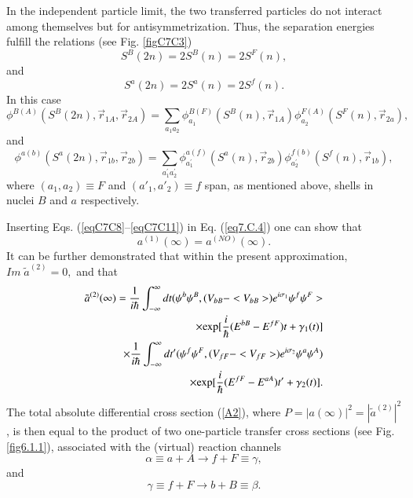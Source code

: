 \begin{subappendices}
In the independent particle limit, the two transferred particles do not interact among themselves but for antisymmetrization. 
Thus, the separation energies fulfill the relations (see Fig. \ref{figC7C3})
\begin{equation}\label{eqC7C8}
S^B(2n) = 2 S^B(n) = 2S^F(n),
\end{equation}
and 
\begin{equation}\label{eqC7C9}
S^a(2n) = 2 S^a(n) = 2 S^f(n).
\end{equation}
In this case 
\begin{equation}\label{eqC7C10}
\phi^{B(A)} (S^B(2n), \vec r_{1A},\vec r_{2A}) = \sum_{a_1 a_2} \phi_{a_1}^{B(F)} (S^B(n),\vec r_{1A}) 
\phi_{a_{2}}^{F(A)} (S^F(n),\vec r_{2a}),
\end{equation}
and 
\begin{equation}\label{eqC7C11}
\phi^{a(b)} (S^a(2n), \vec r_{1b},\vec r_{2b}) = 
\sum_{a^{'}_{1} a^{'}_{2}} \phi_{a^{'}_1}^{a(f)} (S^a(n),\vec r_{2b}) 
\phi_{a^{'}_{2}}^{f(b)} (S^f(n),\vec r_{1b}),
\end{equation}
where $(a_1, a_2) \equiv F$ and $(a'_1, a'_2) \equiv f$ span, as mentioned above, shells in nuclei $B$ and $a$ respectively. 

Inserting Eqs. (\ref{eqC7C8}--\ref{eqC7C11}) in Eq. (\ref{eq7.C.4}) one can show that 
\begin{equation}\label{eqC7C12}
a^{(1)} (\infty) = a^{(NO)}(\infty).
\end{equation}
It can be further demonstrated  that within the present approximation, $Im \; \tilde a^{(2)} =0,$ and that 
\begin{eqnarray}\label{eqC7C13}
\nonumber \tilde a^{(2)} (\infty) = \frac{1}{i \hbar} \int^{\infty}_{-\infty} dt (\psi^b \psi^B, (V_{bB} - <V_{bB}>) e^{i \sigma_1} \psi^f \psi^F >\\
\nonumber  \times 
{\rm exp} [\frac{i}{\hbar} (E^{bB} - E^{fF}) t + \gamma_1(t)] \nonumber  \\
\nonumber \times \frac{1}{i \hbar} \int^{\infty}_{-\infty} dt' (\psi^f \psi^F, (V_{fF} - <V_{fF}>) e^{i \sigma_2} \psi^a \psi^A ) \\
\times 
{\rm exp} [\frac{i}{\hbar} (E^{fF} - E^{aA}) t' + \gamma_2(t)].
\label{A12}
\end{eqnarray}
The total absolute differential cross section (\ref{A2}), where $P = |a(\infty)|^2 = |\tilde a^{(2)}|^2$, is then equal to the product of two one-particle transfer cross sections (see Fig. \ref{fig6.1.1}),  associated with the (virtual) reaction channels
\begin{equation}
\alpha \equiv a+A \to f +F \equiv \gamma,
\end{equation}
and 
\begin{equation}
\gamma \equiv f +F \to b+B \equiv \beta.
\end{equation}


\end{subappendices}
